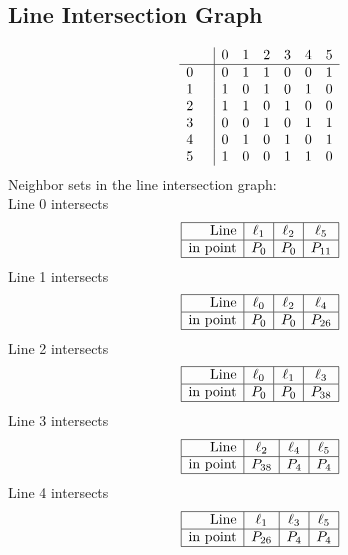 \documentclass{article}
\begin{document}
{\subsection*{Line Intersection Graph}
{\arraycolsep=1pt
$$
\begin{array}{rr|*{6}r}
 &  & 0 & 1 & 2 & 3 & 4 & 5\\
\hline
0 &  & 0 & 1 & 1 & 0 & 0 & 1\\
1 &  & 1 & 0 & 1 & 0 & 1 & 0\\
2 &  & 1 & 1 & 0 & 1 & 0 & 0\\
3 &  & 0 & 0 & 1 & 0 & 1 & 1\\
4 &  & 0 & 1 & 0 & 1 & 0 & 1\\
5 &  & 1 & 0 & 0 & 1 & 1 & 0\\
\end{array}
$$
}%
Neighbor sets in the line intersection graph:\\
Line 0 intersects 
$$
\begin{array}{|r*{3}{|c}|}
\hline
\mbox{Line}  & \ell_{1} & \ell_{2} & \ell_{5}\\
\hline
\mbox{in point}  & P_{0} & P_{0} & P_{11}\\
\hline
\end{array}
$$
Line 1 intersects 
$$
\begin{array}{|r*{3}{|c}|}
\hline
\mbox{Line}  & \ell_{0} & \ell_{2} & \ell_{4}\\
\hline
\mbox{in point}  & P_{0} & P_{0} & P_{26}\\
\hline
\end{array}
$$
Line 2 intersects 
$$
\begin{array}{|r*{3}{|c}|}
\hline
\mbox{Line}  & \ell_{0} & \ell_{1} & \ell_{3}\\
\hline
\mbox{in point}  & P_{0} & P_{0} & P_{38}\\
\hline
\end{array}
$$
Line 3 intersects 
$$
\begin{array}{|r*{3}{|c}|}
\hline
\mbox{Line}  & \ell_{2} & \ell_{4} & \ell_{5}\\
\hline
\mbox{in point}  & P_{38} & P_{4} & P_{4}\\
\hline
\end{array}
$$
Line 4 intersects 
$$
\begin{array}{|r*{3}{|c}|}
\hline
\mbox{Line}  & \ell_{1} & \ell_{3} & \ell_{5}\\
\hline
\mbox{in point}  & P_{26} & P_{4} & P_{4}\\
\hline
\end{array}
$$}
\end{document}
